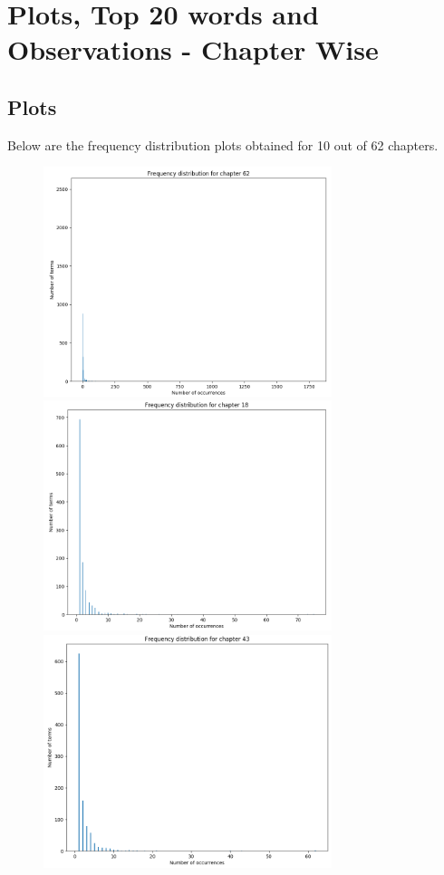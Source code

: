 \documentclass{article}
\begin{document}
\section{Plots, Top 20 words and Observations - Chapter Wise}
\subsection{Plots}
\begin{flushleft}
	Below are the frequency distribution plots obtained for 10 out of 62 chapters. 
	\begin{figure}[H]
		\begin{minipage}{0.45\linewidth}
			\centering
			\includegraphics[width=0.75\textwidth]{./images/1-chapter_wise-frequency.png}
			\includegraphics[width=0.75\textwidth]{./images/2-chapter_wise-frequency.png}
			\includegraphics[width=0.75\textwidth]{./images/3-chapter_wise-frequency.png}

\end{minipage}
\end{figure}
\end{flushleft}
\end{document}
